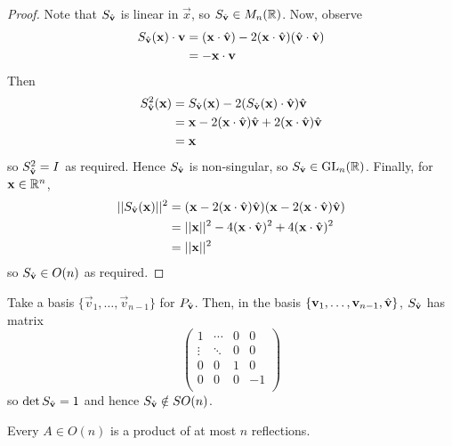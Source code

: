 \documentclass{../template/note}
\begin{document}
    \begin{proof}
        Note that \(S_{\hvec v}\) is linear in \(\vec x\), so \(S_{\hvec v} \in M_n(\RR)\). Now, observe
        \begin{align*}
            S_{\hvec v}(\vec x) \cdot \vec v &= (\vec x \cdot \hvec v) - 2(\vec x \cdot \hvec v)(\hvec v \cdot \hvec v) \\
            &= -\vec x \cdot \vec v
        \end{align*}
        Then
        \begin{align*}
            S_{\hvec v}^2(\vec x) &= S_{\hvec v}(\vec x) - 2(S_{\hvec v}(\vec x) \cdot \hvec v)\hvec v \\
            &= \vec x - 2(\vec x \cdot \hvec v)\hvec v + 2(\vec x \cdot \hvec v)\hvec v \\
            &= \vec x
        \end{align*}
        so \(S_{\hvec v}^2 = I\) as required. Hence \(S_{\hvec v}\) is non-singular, so \(S_{\hvec v} \in \GL_n(\RR)\). Finally, for \(\vec x \in \RR^n\),
        \begin{align*}
            ||S_{\hvec v}(\vec x)||^2 &= (\vec x - 2(\vec x \cdot \hvec v)\hvec v)(\vec x - 2(\vec x \cdot \hvec v)\hvec v) \\
            &= ||\vec x||^2 - 4(\vec x \cdot \hvec v)^2 + 4(\vec x \cdot \hvec v)^2 \\
            &= ||\vec x||^2
        \end{align*}
        so \(S_{\hvec v} \in O(n)\) as required.        
    \end{proof}
    
    \begin{remark}
        Take a basis \(\{\vec v_1, \dots, \vec v_{n-1}\}\) for \(P_{\hvec v}\). Then, in the basis \(\{\vec v_1, \dots, \vec v_{n-1}, \hvec v\}\), \(S_{\hvec v}\) has matrix
        \[
            \begin{pmatrix}
             1 & \cdots & 0 & 0 \\
             \vdots & \ddots & 0 & 0 \\
             0 & 0 & 1 & 0 \\
             0 & 0 & 0 & -1 \\
            \end{pmatrix}
        \]
        so \(\det S_{\hvec v} = 1\) and hence \(S_{\hvec v} \notin SO(n)\).
    \end{remark}
    
    \begin{theorem}
        Every \(A \in O(n)\) is a product of at most \(n\) reflections.
    \end{theorem}
    
\end{document}
